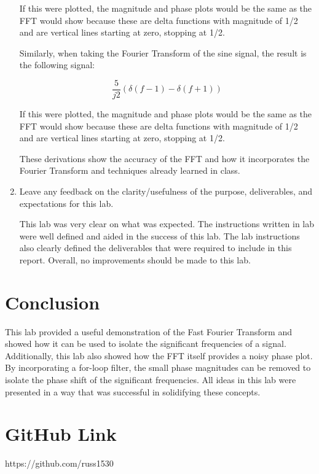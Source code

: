 \documentclass[12pt, titlepage]{article}
\begin{document}
\begin{enumerate}
        If this were plotted, the magnitude and phase plots would be the same as the FFT would show because these are delta functions with magnitude of 1/2 and are vertical lines starting at zero, stopping at 1/2.
        
        Similarly, when taking the Fourier Transform of the sine signal, the result is the following signal:
        
        \begin{equation}
            \nonumber
            \frac{5}{j2}(\delta(f-1)-\delta(f+1))
        \end{equation}
        
        If this were plotted, the magnitude and phase plots would be the same as the FFT would show because these are delta functions with magnitude of 1/2 and are vertical lines starting at zero, stopping at 1/2.
        
        These derivations show the accuracy of the FFT and how it incorporates the Fourier Transform and techniques already learned in class.
        
        \item Leave any feedback on the clarity/usefulness of the purpose, deliverables, and expectations for this lab.
        
        This lab was very clear on what was expected. The instructions written in lab were well defined and aided in the success of this lab. The lab instructions also clearly defined the deliverables that were required to include in this report. Overall, no improvements should be made to this lab.
    \end{enumerate}
       
    \clearpage
    \section{Conclusion}
    This lab provided a useful demonstration of the Fast Fourier Transform and showed how it can be used to isolate the significant frequencies of a signal. Additionally, this lab also showed how the FFT itself provides a noisy phase plot. By incorporating a for-loop filter, the small phase magnitudes can be removed to isolate the phase shift of the significant frequencies. All ideas in this lab were presented in a way that was successful in solidifying these concepts.
    
    \section{GitHub Link}
        https://github.com/russ1530
\end{document}
